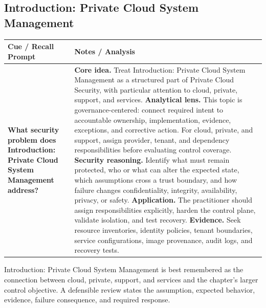 \documentclass[11pt]{article}
\newcommand{\CornellHeader}{%
\rowcolor{Navy}\color{white}\bfseries Cue / Recall Prompt & \color{white}\bfseries Notes / Analysis\\\hline}
\newcommand{\CornellRow}[2]{%
\cellcolor{CueGray}\RaggedRight\textbf{#1} & \RaggedRight #2\\\hline}
\begin{document}
\subsection*{Introduction: Private Cloud System Management}
\begin{longtable}{>{\RaggedRight\arraybackslash}p{}|>{\RaggedRight\arraybackslash}p{}}
\CornellHeader
\CornellRow{What security problem does Introduction: Private Cloud System Management address?}{\textbf{Core idea.} Treat Introduction: Private Cloud System Management as a structured part of Private Cloud Security, with particular attention to cloud, private, support, and services. \textbf{Analytical lens.} This topic is governance-centered: connect required intent to accountable ownership, implementation, evidence, exceptions, and corrective action. For cloud, private, and support, assign provider, tenant, and dependency responsibilities before evaluating control coverage. \textbf{Security reasoning.} Identify what must remain protected, who or what can alter the expected state, which assumptions cross a trust boundary, and how failure changes confidentiality, integrity, availability, privacy, or safety. \textbf{Application.} The practitioner should assign responsibilities explicitly, harden the control plane, validate isolation, and test recovery. \textbf{Evidence.} Seek resource inventories, identity policies, tenant boundaries, service configurations, image provenance, audit logs, and recovery tests.}
\end{longtable}
\begin{topicsummary}
Introduction: Private Cloud System Management is best remembered as the connection between cloud, private, support, and services and the chapter's larger control objective. A defensible review states the assumption, expected behavior, evidence, failure consequence, and required response.
\end{topicsummary}
\end{document}
